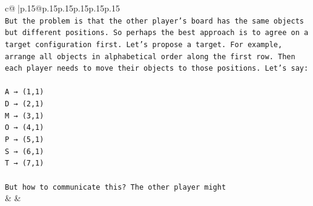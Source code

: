 \documentclass{article}
\begin{document}
{\begin{supertabular}{c@{$\;$}|p{.15\linewidth}@{}p{.15\linewidth}p{.15\linewidth}p{.15\linewidth}p{.15\linewidth}p{.15\linewidth}}
{{{\\ 
\texttt{But the problem is that the other player's board has the same objects but different positions. So perhaps the best approach is to agree on a target configuration first. Let's propose a target. For example, arrange all objects in alphabetical order along the first row. Then each player needs to move their objects to those positions. Let's say:} \\
\\ 
\texttt{A → (1,1)} \\
\texttt{D → (2,1)} \\
\texttt{M → (3,1)} \\
\texttt{O → (4,1)} \\
\texttt{P → (5,1)} \\
\texttt{S → (6,1)} \\
\texttt{T → (7,1)} \\
\\ 
\texttt{But how to communicate this? The other player might} \\
            }
        }
    }
    & & \\ \\


\end{supertabular}}
\end{document}
